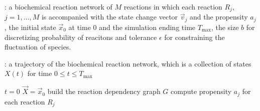 \begin{algorithm}[H]
\DontPrintSemicolon
{}

\caption{\protect\TitleFunction{}}
\label{algo:pw-dmc}

\Input: a biochemical reaction network of $M$ reactions in which each reaction $R_j$, $j=1, \dots, M$ is accompanied with the state change vector $\vec{v}_j$ and the propensity $a_j$, the initial state $\vec{x}_0$ at time $0$ and the simulation ending time $T_{\max}$, the size $b$ for discretizing probability of reacitons and tolerance $\epsilon$ for constraining the fluctuation of species.\;

\Output: a trajectory of the biochemical reaction network, which is a collection of states $X(t)$ for time $0\le t\le T_{\max}$\;

$t = 0$\;
$\vec{X} = \vec{x}_0$\;
build the reaction dependency graph $G$\;
compute propensity $a_j$ for each reaction $R_j$\;


\end{algorithm}
